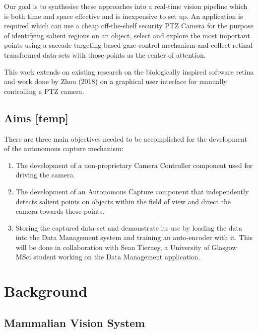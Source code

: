 \documentclass{l4proj}
\begin{document}
 Our goal is to synthesise these approaches into a real-time vision pipeline which is both time and space effective and is inexpensive to set up. An application is required which can use a cheap off-the-shelf security PTZ Camera for the purpose of identifying salient regions on an object, select and explore the most important points using a saccade targeting based gaze control mechanism and collect retinal transformed data-sets with those points as the center of attention. 
 
 This work extends on existing research on the biologically inspired software retina and work done by Zhou (2018) on a graphical user interface for manually controlling a PTZ camera.
 
 
 \section{Aims [temp]}
 
There are three main objectives needed to be accomplished for the development of the autonomous capture mechanism:
 
\vspace{0.2cm}  
\begin{enumerate}
    \item The development of a non-proprietary Camera Controller component used for driving the camera.
    \item The development of an Autonomous Capture component that independently detects salient points on objects within the field of view and direct the camera towards those points.  
    \item Storing the captured data-set and demonstrate its use by loading the data into the Data Management system and training an auto-encoder with it. This will be done in collaboration with Sean Tierney, a University of Glasgow MSci student working on the Data Management application. 
    
    
\end{enumerate}



\chapter{Background}

\section{Mammalian Vision System}
\end{document}
